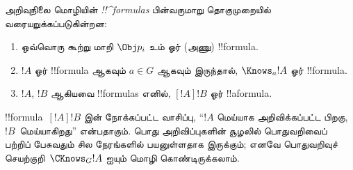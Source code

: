 \documentclass[../../../include/open-logic-section]{subfiles}
\begin{document}
\begin{defn}
  அறிவுநிலை மொழியின் \emph{!!^{formula}s} பின்வருமாறு தொகுமுறையில்
  வரையறுக்கப்படுகின்றன:
  \begin{enumerate}


  \item ஒவ்வொரு கூற்று மாறி $\Obj p_i$ உம் ஓர் (அணு)
  !!{formula}.






  \item $!A$ ஓர் !!{formula} ஆகவும் $a \in G$ ஆகவும் இருந்தால்,
  $\Knows_a !A$ ஓர் !!{formula}.

  \item $!A$, $!B$ ஆகியவை !!{formula}s எனில், $[!A] !B$ ஓர் !!a{formula}.

\end{enumerate}
\end{defn}

!!{formula}~$[!A] !B$ இன் நோக்கப்பட்ட வாசிப்பு, ``$!A$ மெய்யாக
அறிவிக்கப்பட்ட பிறகு, $!B$~மெய்யாகிறது'' என்பதாகும். பொது அறிவிப்புகளின்
சூழலில் பொதுவறிவைப் பற்றிப் பேசுவதும் சில நேரங்களில் பயனுள்ளதாக இருக்கும்;
எனவே பொதுவறிவுச் செயற்குறி~$\CKnows_G !A$ ஐயும் மொழி கொண்டிருக்கலாம்.
\end{document}
